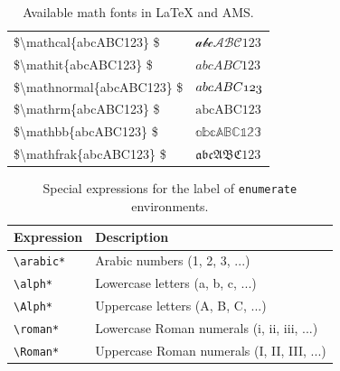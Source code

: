 \documentclass[a4paper, 12pt]{report}
\def\tbs{\textbackslash}
\begin{document}
    \begin{table}[h]
        \centering
        \begin{tabular}{>{\ttfamily\$}l<{\$}l}
            \toprule
            \tbs{}mathcal\{abcABC123\}    & $\mathcal{abcABC123}$ \\
            \tbs{}mathit\{abcABC123\}     & $\mathit{abcABC123}$ \\
            \tbs{}mathnormal\{abcABC123\} & $\mathnormal{abcABC123}$ \\
            \tbs{}mathrm\{abcABC123\}     & $\mathrm{abcABC123}$ \\
            \tbs{}mathbb\{abcABC123\}     & $\mathbb{abcABC123}$ \\
            \tbs{}mathfrak\{abcABC123\}   & $\mathfrak{abcABC123}$ \\
            \bottomrule
        \end{tabular}
        \caption{Available math fonts in \LaTeX{} and AMS.}
        \label{tab:math_fonts}
    \end{table}

    \begin{table}[h]
        \centering
        \begin{tabular}{ll}
            \toprule
            \textbf{Expression} & \textbf{Description} \\
            \midrule
            \texttt{\tbs{}arabic*} & Arabic numbers (1, 2, 3, ...) \\
            \texttt{\tbs{}alph*}   & Lowercase letters (a, b, c, ...) \\
            \texttt{\tbs{}Alph*}   & Uppercase letters (A, B, C, ...) \\
            \texttt{\tbs{}roman*}  & Lowercase Roman numerals (i, ii, iii, ...) \\
            \texttt{\tbs{}Roman*}  & Uppercase Roman numerals (I, II, III, ...) \\
            \bottomrule
        \end{tabular}
        \caption{Special expressions for the label of \texttt{enumerate} environments.}
        \label{tab:enumerate_special_expressions}
    \end{table}
\end{document}
